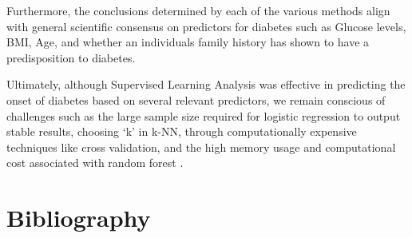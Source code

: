 \documentclass[12pt]{article}
\begin{document}
Furthermore, the conclusions determined by each of the various methods align with general scientific consensus on predictors for diabetes such as Glucose levels, BMI, Age, and whether an individuals family history has shown to have a predisposition to diabetes. 

Ultimately, although Supervised Learning Analysis was effective in predicting the onset of diabetes based on several relevant predictors, we remain conscious of challenges such as the large sample size required for logistic regression to output stable results, choosing ‘k’ in k-NN, through computationally expensive techniques like cross validation, and the high memory usage and computational cost associated with random forest \citep{7724478}.


 \section{Bibliography}
 \singlespacing
  
 
\end{document}
